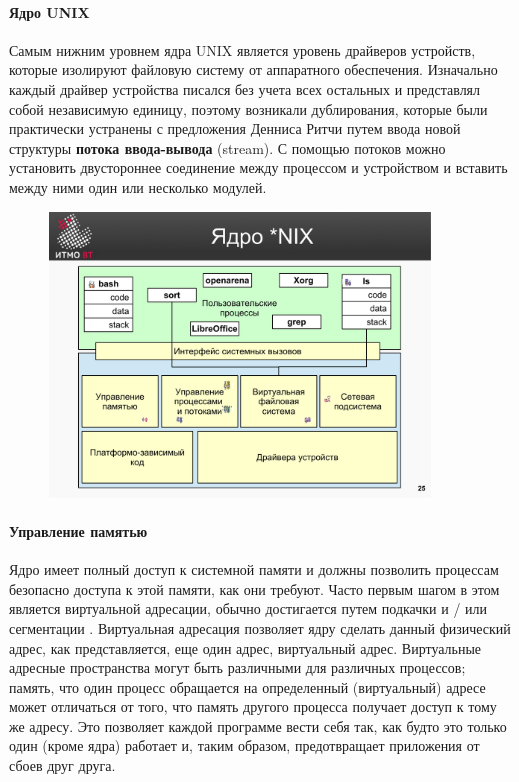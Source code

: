 \documentclass[10pt]{article}
\begin{document}
	\paragraph{Ядро UNIX}
	Самым нижним уровнем ядра UNIX является уровень драйверов устройств, которые изолируют файловую систему от аппаратного обеспечения. Изначально каждый драйвер устройства писался без учета всех остальных и представлял собой независимую единицу, поэтому возникали дублирования, которые были практически устранены с предложения Денниса Ритчи путем ввода новой структуры \textbf{потока ввода-вывода} (stream). С помощью потоков можно установить двустороннее соединение между процессом и устройством и вставить между ними один или несколько модулей.

	\begin{figure}[ht!]
		\centering
		\includegraphics[width=0.9\textwidth]{assets/pages/nix_core.pdf}
	\end{figure}
	\paragraph{Управление памятью}
	Ядро имеет полный доступ к системной памяти и должны позволить процессам безопасно доступа к этой памяти, как они требуют. Часто первым шагом в этом является виртуальной адресации, обычно достигается путем подкачки и / или сегментации . Виртуальная адресация позволяет ядру сделать данный физический адрес, как представляется, еще один адрес, виртуальный адрес. Виртуальные адресные пространства могут быть различными для различных процессов; память, что один процесс обращается на определенный (виртуальный) адресе может отличаться от того, что память другого процесса получает доступ к тому же адресу. Это позволяет каждой программе вести себя так, как будто это только один (кроме ядра) работает и, таким образом, предотвращает приложения от сбоев друг друга.
\end{document}
